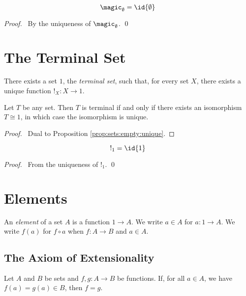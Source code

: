 \begin{prop}
  \[ \magic_\emptyset = \id{\emptyset} \]
\end{prop}

\begin{proof}
  \pf\ By the uniqueness of $\magic_\emptyset$. \qed
\end{proof}

\section{The Terminal Set}

\begin{ax}
  There exists a set $1$, the \emph{terminal set}, such that, for every set
  $X$, there exists a unique function $!_X : X \rightarrow 1$.
\end{ax}

\begin{prop}
  Let $T$ be any set. Then $T$ is terminal if and only if there exists an isomorphism $T \cong 1$, in which case the isomorphism is unique.
\end{prop}

\begin{proof}
  \pf\ Dual to Proposition \ref{prop:sets:empty:unique}.
\end{proof}

\begin{prop}
  \[ !_1 = \id{1} \]
\end{prop}

\begin{proof}
  \pf\ From the uniqueness of $!_1$. \qed
\end{proof}

\section{Elements}

\begin{df}[Element]
  An \emph{element} of a set $A$ is a function $1 \rightarrow A$. We write $a
  \in A$ for $a : 1 \rightarrow A$. We write $f(a)$ for $f \circ a$ when $f :
  A \rightarrow B$ and $a \in A$.
\end{df}

\subsection{The Axiom of Extensionality}

\begin{ax}[Extensionality]
 Let $A$ and $B$ be sets and $f, g : A \rightarrow B$ be functions. If, for
all $a \in A$, we have $f(a) = g(a) \in B$, then $f = g$.
\end{ax}

